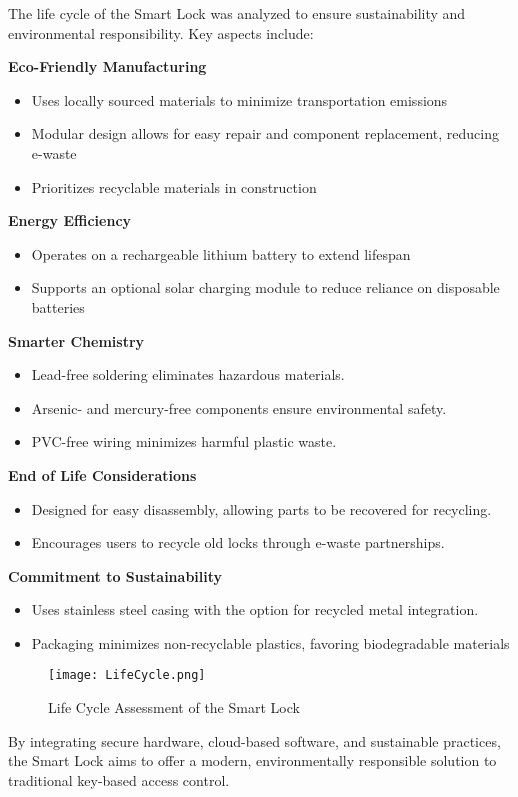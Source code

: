 The life cycle of the Smart Lock was analyzed to ensure sustainability and environmental responsibility. Key aspects include: \newline

\textbf{Eco-Friendly Manufacturing}
\begin{itemize}
    \item Uses locally sourced materials to minimize transportation emissions
    \item Modular design allows for easy repair and component replacement, reducing e-waste
    \item Prioritizes recyclable materials in construction
\end{itemize}

\textbf{Energy Efficiency}
\begin{itemize}
    \item Operates on a rechargeable lithium battery to extend lifespan
    \item Supports an optional solar charging module to reduce reliance on disposable batteries
\end{itemize}

\textbf{Smarter Chemistry}
\begin{itemize}
    \item Lead-free soldering eliminates hazardous materials.
    \item Arsenic- and mercury-free components ensure environmental safety.
    \item PVC-free wiring minimizes harmful plastic waste.
\end{itemize}

\textbf{End of Life Considerations}
\begin{itemize}
    \item Designed for easy disassembly, allowing parts to be recovered for recycling.
    \item Encourages users to recycle old locks through e-waste partnerships.
\end{itemize}

\textbf{Commitment to Sustainability}
\begin{itemize}
    \item Uses stainless steel casing with the option for recycled metal integration.
    \item Packaging minimizes non-recyclable plastics, favoring biodegradable materials
\end{itemize}

\begin{figure}[h]
    \centering
    \texttt{[image: LifeCycle.png]}
    \caption{Life Cycle Assessment of the Smart Lock}
    \label{fig:lifecycle}
\end{figure}

\noindent By integrating secure hardware, cloud-based software, and sustainable practices, the Smart Lock aims to offer a modern, environmentally responsible solution to traditional key-based access control.